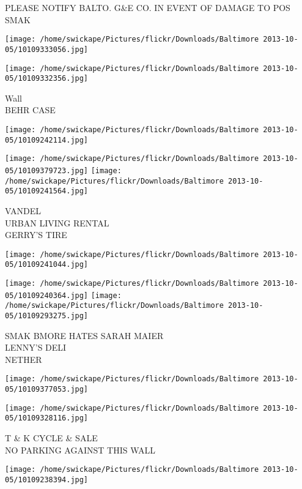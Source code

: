 \documentclass[10pt,letterpaper]{article}
\begin{document}
PLEASE NOTIFY BALTO. G\&E CO. IN EVENT OF DAMAGE TO POS\\
SMAK
\pagebreak

\texttt{[image: /home/swickape/Pictures/flickr/Downloads/Baltimore 2013-10-05/10109333056.jpg]}

\vspace{0.25in}
\texttt{[image: /home/swickape/Pictures/flickr/Downloads/Baltimore 2013-10-05/10109332356.jpg]}

Wall\\
BEHR CASE
\pagebreak

\texttt{[image: /home/swickape/Pictures/flickr/Downloads/Baltimore 2013-10-05/10109242114.jpg]}

\vspace{0.25in}
\texttt{[image: /home/swickape/Pictures/flickr/Downloads/Baltimore 2013-10-05/10109379723.jpg]}
\texttt{[image: /home/swickape/Pictures/flickr/Downloads/Baltimore 2013-10-05/10109241564.jpg]}

VANDEL\\
URBAN LIVING RENTAL\\
GERRY'S TIRE
\pagebreak

\texttt{[image: /home/swickape/Pictures/flickr/Downloads/Baltimore 2013-10-05/10109241044.jpg]}

\vspace{0.25in}
\texttt{[image: /home/swickape/Pictures/flickr/Downloads/Baltimore 2013-10-05/10109240364.jpg]}
\texttt{[image: /home/swickape/Pictures/flickr/Downloads/Baltimore 2013-10-05/10109293275.jpg]}

SMAK BMORE HATES SARAH MAIER\\
LENNY'S DELI\\
NETHER
\pagebreak

\texttt{[image: /home/swickape/Pictures/flickr/Downloads/Baltimore 2013-10-05/10109377053.jpg]}

\vspace{0.25in}
\texttt{[image: /home/swickape/Pictures/flickr/Downloads/Baltimore 2013-10-05/10109328116.jpg]}

T \& K CYCLE \& SALE\\
NO PARKING AGAINST THIS WALL
\pagebreak

\texttt{[image: /home/swickape/Pictures/flickr/Downloads/Baltimore 2013-10-05/10109238394.jpg]}
\end{document}
